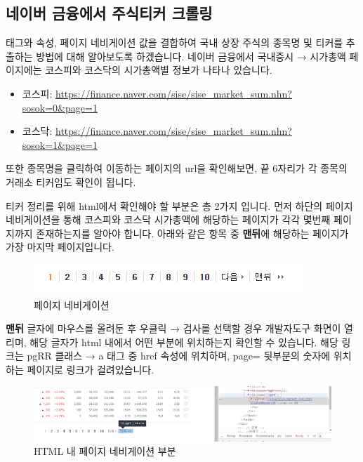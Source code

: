 \documentclass[12pt,]{book}
\providecommand{\tightlist}{%
  \setlength{\itemsep}{0pt}\setlength{\parskip}{0pt}}
\begin{document}
\hypertarget{section-16}{%
\subsection{네이버 금융에서 주식티커 크롤링}\label{section-16}}

태그와 속성, 페이지 네비게이션 값을 결합하여 국내 상장 주식의 종목명 및 티커를 추출하는 방법에 대해 알아보도록 하겠습니다. 네이버 금융에서 국내증시 → 시가총액 페이지에는 코스피와 코스닥의 시가총액별 정보가 나타나 있습니다.

\begin{itemize}
\tightlist
\item
  코스피: \url{https://finance.naver.com/sise/sise_market_sum.nhn?sosok=0\&page=1}
\item
  코스닥: \url{https://finance.naver.com/sise/sise_market_sum.nhn?sosok=1\&page=1}
\end{itemize}

또한 종목명을 클릭하여 이동하는 페이지의 url을 확인해보면, 끝 6자리가 각 종목의 거래소 티커임도 확인이 됩니다.

티커 정리를 위해 html에서 확인해야 할 부분은 총 2가지 입니다. 먼저 하단의 페이지 네비게이션을 통해 코스피와 코스닥 시가총액에 해당하는 페이지가 각각 몇번째 페이지까지 존재하는지를 알아야 합니다. 아래와 같은 항목 중 \textbf{맨뒤}에 해당하는 페이지가 가장 마지막 페이지입니다.

\begin{figure}[h]

{\centering \includegraphics[width=0.7\linewidth]{images/crawl_page_navi} 

}

\caption{페이지 네비게이션}\label{fig:unnamed-chunk-19}
\end{figure}

\textbf{맨뒤} 글자에 마우스를 올려둔 후 우클릭 → 검사를 선택할 경우 개발자도구 화면이 열리며, 해당 글자가 html 내에서 어떤 부분에 위치하는지 확인할 수 있습니다. 해당 링크는 pgRR 클래스 → a 태그 중 href 속성에 위치하며, page= 뒷부분의 숫자에 위치하는 페이지로 링크가 걸려있습니다.

\begin{figure}[h]

{\centering \includegraphics[width=1\linewidth]{images/crawl_page_navi2} 

}

\caption{HTML 내 페이지 네비게이션 부분}\label{fig:unnamed-chunk-20}
\end{figure}
\end{document}
